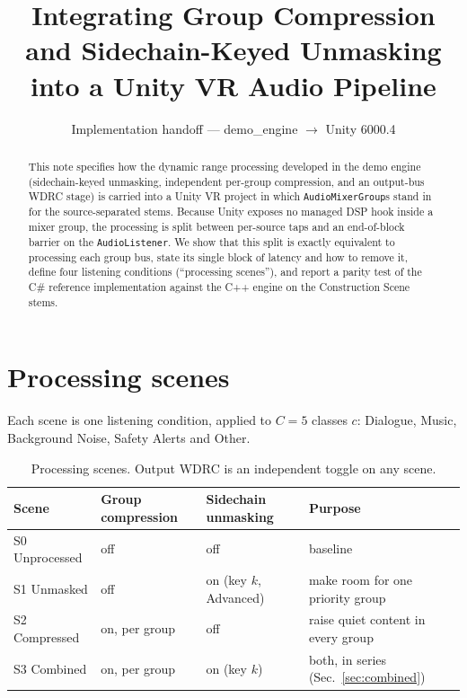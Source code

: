 \documentclass[11pt]{article}
\title{Integrating Group Compression and Sidechain-Keyed Unmasking\\into a Unity VR Audio Pipeline}
\author{Implementation handoff --- demo\_engine $\rightarrow$ Unity 6000.4}
\date{}
\newcommand{\code}[1]{\texttt{#1}}
\begin{document}
\maketitle

\begin{abstract}
This note specifies how the dynamic range processing developed in the demo
engine (sidechain-keyed unmasking, independent per-group compression, and an
output-bus WDRC stage) is carried into a Unity VR project in which
\code{AudioMixerGroup}s stand in for the source-separated stems. Because Unity
exposes no managed DSP hook inside a mixer group, the processing is split
between per-source taps and an end-of-block barrier on the
\code{AudioListener}. We show that this split is exactly equivalent to
processing each group bus, state its single block of latency and how to
remove it, define four listening conditions (``processing scenes''), and
report a parity test of the C\# reference implementation against the C++
engine on the Construction Scene stems.
\end{abstract}

\section{Processing scenes}
\label{sec:scenes}

Each scene is one listening condition, applied to $C=5$ classes $c$:
Dialogue, Music, Background Noise, Safety Alerts and Other.

\begin{table}[H]
\centering
\small
\caption{Processing scenes. Output WDRC is an independent toggle on any scene.}
\label{tab:scenes}
\begin{tabular}{@{}l p{2.6cm} p{3.4cm} p{4.6cm}@{}}
\toprule
\textbf{Scene} & \textbf{Group compression} & \textbf{Sidechain unmasking} & \textbf{Purpose} \\
\midrule
S0 Unprocessed & off & off & baseline \\
S1 Unmasked    & off & on (key $k$, Advanced) & make room for one priority group \\
S2 Compressed  & on, per group & off & raise quiet content in every group \\
S3 Combined    & on, per group & on (key $k$) & both, in series (Sec.~\ref{sec:combined}) \\
\bottomrule
\end{tabular}
\end{table}
\end{document}
